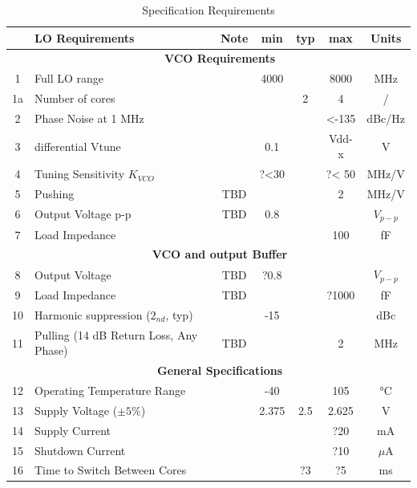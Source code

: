 \documentclass{article}
\begin{document}
\begin{table}[ht]
	\centering
	\begin{tabular}{|c|l|c|c|c|c|c|}
		\hline
		& LO Requirements & Note & min & typ & max & Units \\
		\hline
		& \multicolumn{6}{|c|}{\textbf{VCO Requirements}} \\
		\hline
		1 & Full LO range &  & 4000  &  & 8000 & MHz \\ 
		\hline
		1a & Number of cores &  &   & 2 & 4 & / \\ 
		\hline
		2 & Phase Noise at 1 MHz &  &  &  & <-135 & dBc/Hz \\ 
		\hline
		3 & differential Vtune &  & 0.1 &  & Vdd-x & V  \\ %
		\hline
		4 & Tuning Sensitivity $K_{VCO}$ &  & ?<30 &  & ?< 50 & MHz/V  \\ 
		\hline
		5 & Pushing & TBD &  &  & 2 & MHz/V  \\ 
		\hline
		6 & Output Voltage p-p & TBD & 0.8 &  & & $V_{p-p}$  \\ 
		\hline
		7 & Load Impedance &  &  &  & 100 & fF  \\ 
		\hline
		& \multicolumn{6}{|c|}{\textbf{VCO and output Buffer}} \\
		\hline
		8 & Output Voltage & TBD & ?0.8  &  &  & $V_{p-p}$ \\ 
		\hline
		9 & Load Impedance & TBD &  &  & ?1000 & fF  \\ 
		\hline
		10 & Harmonic suppression ($2_{nd}$, typ) &  & -15 &  &  & dBc  \\ 
		\hline
		11 & Pulling (14 dB Return Loss, Any Phase) & TBD &  &  & 2 & MHz  \\ 
		\hline
		& \multicolumn{6}{|c|}{\textbf{General Specifications}} \\
		\hline
		12 & Operating Temperature Range &  & -40 &  & 105 & °C  \\ 
		\hline
		13 & Supply Voltage ($\pm 5\%$) &  & 2.375 & 2.5 & 2.625 & V  \\ 
		\hline
		14 & Supply Current &  &  &  & ?20 & mA  \\ 
		\hline
		15 & Shutdown Current &  &  &  & ?10 & $\mu$A  \\ 
		\hline
		16 & Time to Switch Between Cores  &  &  & ?3 & ?5 & ms  \\ 
		\hline
	\end{tabular}
	\label{table-spec-ultra-low-noise}
	\caption{Specification Requirements} 

\end{table}
\end{document}
